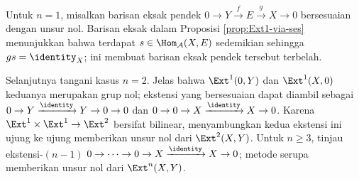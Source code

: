 \begin{bukti}
	Untuk $n = 1$, misalkan barisan eksak pendek
	$0 \to Y \xrightarrow{f} E \xrightarrow{g} X \to 0$ bersesuaian dengan
	unsur nol. Barisan eksak dalam Proposisi \ref{prop:Ext1-via-ses}
	menunjukkan bahwa terdapat $s \in \Hom_{\mathcal{A}}(X, E)$ sedemikian
	sehingga $gs = \identity_X$; ini membuat barisan eksak pendek tersebut
	terbelah.
	
	Selanjutnya tangani kasus $n = 2$. Jelas bahwa $\Ext^1(0, Y)$ dan
	$\Ext^1(X, 0)$ keduanya merupakan grup nol; ekstensi yang
	bersesuaian dapat diambil sebagai
	$0 \to Y \xrightarrow{\identity} Y \to 0 \to 0$ dan
	$0 \to 0 \to X \xrightarrow{\identity} X \to 0$. Karena
	$\Ext^1 \times \Ext^1 \to \Ext^2$ bersifat bilinear, menyambungkan kedua
	ekstensi ini ujung ke ujung memberikan unsur nol dari $\Ext^2(X, Y)$. Untuk
	$n \geq 3$, tinjau ekstensi-$(n-1)$
	$0 \to \cdots \to 0 \to X \xrightarrow{\identity} X \to 0$; metode serupa
	memberikan unsur nol dari $\Ext^n(X, Y)$.
\end{bukti}

